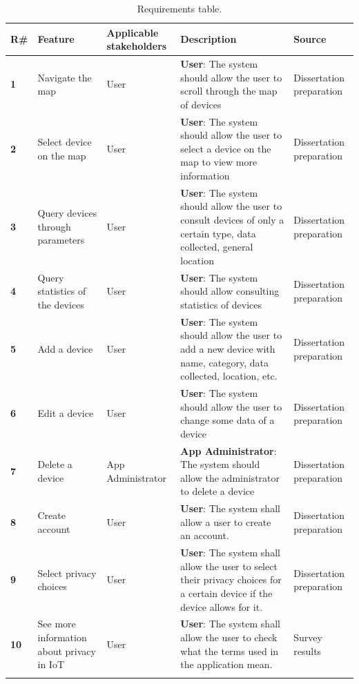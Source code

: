 \begin{longtable}{|l|p{}|p{}|p{}|p{}|}
    \hline
    \rowcolor{blue!5}
    \textbf{R\#} & \textbf{Feature} & \textbf{Applicable stakeholders} & \textbf{Description} & \textbf{Source} \\
    \hline
    \textbf{1} & Navigate the map & User & \textbf{User}: The system should allow the user to scroll through the map of devices & Dissertation preparation \\
    \hline
    \textbf{2} & Select device on the map & User & \textbf{User}: The system should allow the user to select a device on the map to view more information & Dissertation preparation \\
    \hline
    \textbf{3} & Query devices through parameters & User & \textbf{User}: The system should allow the user to consult devices of only a certain type, data collected, general location & Dissertation preparation \\
    \hline
    \textbf{4} & Query statistics of the devices & User & \textbf{User}: The system should allow consulting statistics of devices & Dissertation preparation \\
    \hline
    \textbf{5} & Add a device & User & \textbf{User}: The system should allow the user to add a new device with name, category, data collected, location, etc. & Dissertation preparation \\
    \hline
    \textbf{6} & Edit a device & User & \textbf{User}: The system should allow the user to change some data of a device & Dissertation preparation \\
    \hline
    \textbf{7} & Delete a device & App Administrator & \textbf{App Administrator}: The system should allow the administrator to delete a device & Dissertation preparation \\
    \hline
    \textbf{8} & Create account & User & \textbf{User}: The system shall allow a user to create an account. & Dissertation preparation \\
    \hline
    \textbf{9} & Select privacy choices & User & \textbf{User}: The system shall allow the user to select their privacy choices for a certain device if the device allows for it. & Dissertation preparation \\
    \hline
    \textbf{10} & See more information about privacy in IoT & User & \textbf{User}: The system shall allow the user to check what the terms used in the application mean. & Survey results \\
    \hline
    \caption{Requirements table.}
    \label{table:table1}
\end{longtable}

